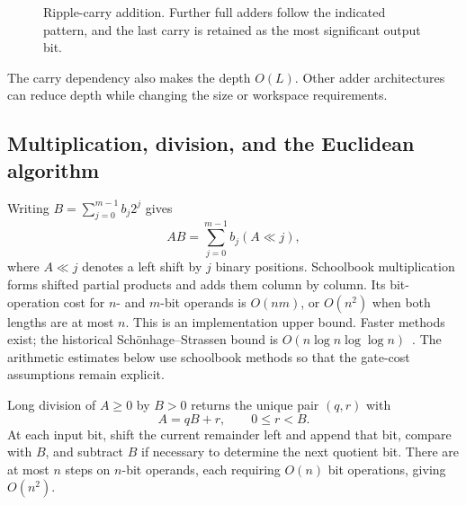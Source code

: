 \documentclass[11pt,oneside,openany]{book}
\theoremstyle{definition}
\begin{document}
\begin{figure}[htbp]
\centering
{}
\caption{Ripple-carry addition. Further full adders follow the indicated pattern, and the last carry is retained as the most significant output bit.}
\end{figure}
\par
The carry dependency also makes the depth $O(L)$. Other adder architectures can reduce depth while changing the size or workspace requirements.

\subsection{Multiplication, division, and the Euclidean algorithm}
Writing $B=\sum_{j=0}^{m-1}b_j2^j$ gives
\begin{equation}
 AB=\sum_{j=0}^{m-1}b_j(A\ll j),
\end{equation}
where $A\ll j$ denotes a left shift by $j$ binary positions. Schoolbook multiplication forms shifted partial products and adds them column by column. Its bit-operation cost for $n$- and $m$-bit operands is $O(nm)$, or $O(n^2)$ when both lengths are at most $n$. This is an implementation upper bound. Faster methods exist; the historical Sch\"onhage--Strassen bound is $O(n\log n\log\log n)$~\cite{SS1971}. The arithmetic estimates below use schoolbook methods so that the gate-cost assumptions remain explicit.

Long division of $A\ge0$ by $B>0$ returns the unique pair $(q,r)$ with
\begin{equation}
 A=qB+r,\qquad0\le r<B.
\end{equation}
At each input bit, shift the current remainder left and append that bit, compare with $B$, and subtract $B$ if necessary to determine the next quotient bit. There are at most $n$ steps on $n$-bit operands, each requiring $O(n)$ bit operations, giving $O(n^2)$.
\end{document}
